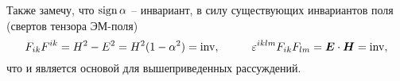 Также замечу, что $\mathop{\mathrm{sign}}\nolimits \alpha$ -- инвариант, в силу существующих инвариантов поля (свертов тензора ЭМ-поля)
\begin{equation*}
	F_{ik} F^{ik} = H^2 - E^2 = H^2 (1 - \alpha^2) = \inv,
	\hspace{10 mm}
	\varepsilon^{iklm} F_{ik} F_{lm} = \vc{E} \cdot \vc{H} = \inv,
\end{equation*}
что и является основой для вышеприведенных рассуждений.

